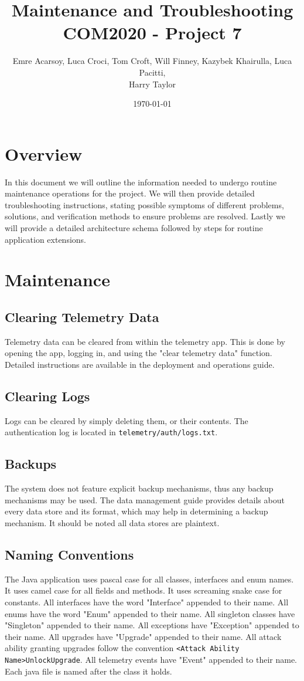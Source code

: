 \documentclass[11pt]{article}
\title{Maintenance and Troubleshooting\\[0.3em]
\large COM2020 - Project 7}
\author{Emre Acarsoy, Luca Croci, Tom Croft, Will Finney, Kazybek Khairulla, Luca Pacitti, \\ Harry Taylor}
\date{\today}
\begin{document}
\maketitle
\tableofcontents
\newpage
\section{Overview}
In this document we will outline the information needed to undergo routine maintenance operations for the project. We will then provide detailed troubleshooting instructions, stating possible symptoms of different problems, solutions, and verification methods to ensure problems are resolved. Lastly we will provide a detailed architecture schema followed by steps for routine application extensions.

\section{Maintenance}
\subsection{Clearing Telemetry Data}
Telemetry data can be cleared from within the telemetry app. This is done by opening the app, logging in, and using the "clear telemetry data" function. Detailed instructions are available in the deployment and operations guide.
\subsection{Clearing Logs}
Logs can be cleared by simply deleting them, or their contents. The authentication log is located in \verb|telemetry/auth/logs.txt|.
\subsection{Backups}
The system does not feature explicit backup mechanisms, thus any backup mechanisms may be used. The data management guide provides details about every data store and its format, which may help in determining a backup mechanism. It should be noted all data stores are plaintext.

\subsection{Naming Conventions}
\label{sec:naming_conventions}
The Java application uses pascal case for all classes, interfaces and enum names. It uses camel case for all fields and methods. It uses screaming snake case for constants. All interfaces have the word "Interface" appended to their name. All enums have the word "Enum" appended to their name. All singleton classes have "Singleton" appended to their name. All exceptions have "Exception" appended to their name. All upgrades have "Upgrade" appended to their name. All attack ability granting upgrades follow the convention \verb|<Attack Ability Name>UnlockUpgrade|. All telemetry events have "Event" appended to their name. Each java file is named after the class it holds.
\end{document}
